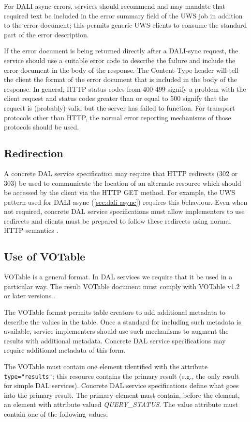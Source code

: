 \documentclass[11pt,letter]{ivoa}
\begin{document}
For DALI-async errors, services should recommend and may mandate that required
text be included in the error summary field of the UWS job in addition to the
error document; this permits generic UWS clients to consume the standard part of
the error description.

If the error document is being returned directly after a DALI-sync request, the
service should use a suitable error code to describe the failure and include the
error document in the body of the response. The Content-Type header will tell
the client the format of the error document that is included in the body of the
response. In general, HTTP status codes from 400-499 signify a problem with the
client request and status codes greater than or equal to 500 signify that the
request is (probably) valid but the server has failed to function. For transport
protocols other than HTTP, the normal error reporting mechanisms of those
protocols should be used.

\subsection{Redirection}
\label{sec:redirects}
A concrete DAL service specification may require that HTTP redirects (302 or
303) be used to communicate the location of an alternate resource which should
be accessed by the client via the HTTP GET method. For example, the UWS pattern
used for DALI-async (\ref{sec:dali-async}) requires this behaviour. Even when not
required, concrete DAL service specifications must allow implementers to use
redirects and clients must be prepared to follow these redirects using normal
HTTP semantics \citep{std:HTTP}.

\subsection{Use of VOTable}
\label{sec:use-votable}
VOTable is a general format. In DAL services we require that it be used in a
particular way. The result VOTable document must comply with VOTable
v1.2 or later versions
\citep{2019ivoa.spec.1021O}.


The VOTable format permits table creators to add additional metadata to describe
the values in the table. Once a standard for including such metadata is
available, service implementers should use such mechanisms to augment the
results with additional metadata. Concrete DAL service specifications may
require additional metadata of this form.

The VOTable must contain one   element identified with the attribute
\verb|type="results"|; this resource contains the primary result (e.g., the only result
for simple DAL services). Concrete DAL service specifications define what goes
into the primary result. The primary  element must contain, before the
 element, an
 element with attribute  valued \emph{QUERY\_STATUS}. The value
attribute must contain one of the following values:
\end{document}
